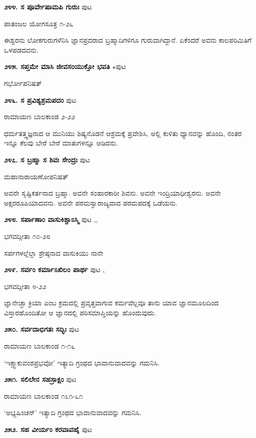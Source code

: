 \medskip
\noindent\textbf{೨೪೪. ಸ ಪೂರ್ವೇಷಾಮಪಿ ಗುರುಃ} \hfill ಪುಟ \pageref{129}

\hfill ಪಾತಂಜಲ ಯೋಗಸೂತ್ರ ೧-೨೬

ಈಶ್ವರನು ಲೋಕಗುರುಗಳೆನಿಸಿ ಜ್ಞಾನಪ್ರದರಾದ ಬ್ರಹ್ಮಾದಿಗಳಿಗೂ ಗುರುವಾಗಿದ್ದಾನೆ. ಏಕೆಂದರೆ ಅವನು ಕಾಲಪರಿಮಿತಿಗೆ ಒಳಪಡದವನು.

\medskip
\noindent\textbf{೨೪೫. ಸಪ್ತಮೇ ಮಾಸಿ ಜೀವಸಂಯುಕ್ತೋ ಭವತಿ} $\star$\hfill ಪುಟ \pageref{85a}

\hfill ಗರ್ಭೋಪನಿಷತ್

\medskip
\noindent\textbf{೨೪೬. ಸ ಪ್ರವಿಶ್ಯಶ್ರಮಪದಂ} \hfill ಪುಟ \pageref{201b}

\hfill ರಾಮಾಯಣ ಬಾಲಕಾಂಡ ೨-೨೨

ಧರ್ಮತತ್ತ್ವಜ್ಞನಾದ ಆ ಮುನಿಯು ಶಿಷ್ಯನೊಡನೆ ಆಶ್ರಮಕ್ಕೆ ಪ್ರವೇಶಿಸಿ, ಅಲ್ಲಿ ಕುಳಿತು ಧ್ಯಾನವನ್ನು ಹೊಂದಿ, ನಂತರ ಇನ್ನೂ ಕೆಲವು ಬೇರೆ ಬೇರೆ ಮಾತುಗಳನ್ನೂ ಆಡಿದನು.

\medskip
\noindent\textbf{೨೪೭. ಸ ಬ್ರಹ್ಮಾ ಸ ಶಿವಃ ಸೇಂದ್ರಃ} \hfill ಪುಟ \pageref{249c}

\hfill ಮಹಾನಾರಾಯಣೋಪನಿಷತ್

ಅವನೇ ಸೃಷ್ಟಿಕರ್ತನಾದ ಬ್ರಹ್ಮಾ. ಅವನೇ ಸಂಹಾರಕಾರೀ ಶಿವನು. ಅವನೇ ಇಂದ್ರಿಯಾಧೀಶ್ವರನು. ಅವನೇ ಅಕ್ಷರರೂಪಿಯಾದವನು. ಅವನೇ ಪರಮಸ್ವಾರಾಜ್ಯವಾದ ಪರಮಪದಕ್ಕೆ ಒಡೆಯನು. 

\medskip
\noindent\textbf{೨೪೮. ಸರ್ಪಾಣಾಂ ವಾಸುಕಿಶ್ಚಾಽಸ್ಮಿ} \hfill ಪುಟ \pageref{93b},\pageref{95a},\pageref{98b}

\hfill ಭಗವದ್ಗೀತಾ ೧೦-೨೮

ಸರ್ಪಗಳಲ್ಲೆಲ್ಲಾ ಶ್ರೇಷ್ಠನಾದ ವಾಸುಕಿಯು ನಾನೇ

\medskip
\noindent\textbf{೨೪೯. ಸರ್ವಂ ಕರ್ಮಾಽಖಿಲಂ ಪಾರ್ಥ} \hfill ಪುಟ \pageref{98c},\pageref{78}

\hfill ಭಗವದ್ಗೀತಾ ೪-೨೨

ಜ್ಞಾನೇಚ್ಛಾ ಕ್ರಿಯಾ ಎಂಬ ಕ್ರಮದಲ್ಲಿ ಪ್ರವೃತ್ತವಾಗುವ ಕರ್ಮವೆಲ್ಲವೂ ತಾನು ಯಾವ ಜ್ಞಾನಮೂಲದಿಂದ ವಿಸ್ತಾರಹೊಂದಿತೋ ಆ ಜ್ಞಾನದಲ್ಲಿ ಪರಿಸಮಾಪ್ತಿಯನ್ನು ಹೊಂದುವುದು.

\medskip
\noindent\textbf{೨೫೦. ಸರ್ವದಾಭಿಗತಃ ಸದ್ಭಿಃ} \hfill ಪುಟ \pageref{247e}

\hfill ರಾಮಾಯಣ ಬಾಲಕಾಂಡ ೧-೧೬

`ಇಕ್ಷ್ವಾಕುವಂಶಪ್ರಭವೋ' ಇತ್ಯಾದಿ ಗ್ರಂಥದ ಭಾವಾನುವಾದವನ್ನು ಗಮನಿಸಿ.

\medskip
\noindent\textbf{೨೫೧. ಸಲಿಲೇನ ಸಹಸ್ರಾಕ್ಷಂ} \hfill ಪುಟ \pageref{248b}

\hfill ರಾಮಾಯಣ ಬಾಲಕಾಂಡ ೧೩೧-೬೧

`ಅಭ್ಯಷಿಂಚನ್' ಇತ್ಯಾದಿ ಗ್ರಂಥದ ಭಾವಾನುವಾದವನ್ನು ಗಮನಿಸಿ.

\medskip
\noindent\textbf{೨೫೨. ಸಹ ವೀರ್ಯಂ ಕರವಾವಹೈ} \hfill ಪುಟ \pageref{130b}

